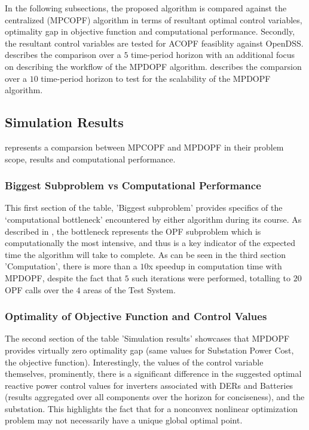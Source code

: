 \documentclass[../../outputs/main.tex]{subfiles}
\begin{document}
In the following subsections, the proposed algorithm is compared against the centralized (MPCOPF) algorithm in terms of resultant optimal control variables, optimality gap in objective function and computational performance. Secondly, the resultant control variables are tested for ACOPF feasiblity against OpenDSS.  describes the comparison over a $5$ time-period horizon with an additional focus on describing the workflow of the MPDOPF algorithm.  describes the comparsion over a $10$ time-period horizon to test for the scalability of the MPDOPF algorithm.

\subsection{Simulation Results} \label{subsec:simulationResults}

 represents a comparsion between MPCOPF and MPDOPF in their problem scope, results and computational performance.

\subsubsection{Biggest Subproblem vs Computational Performance}
This first section of the table, 'Biggest subproblem' provides specifics of the `computational bottleneck' encountered by either algorithm during its course. As described in , the bottleneck represents the OPF subproblem which is computationally the most intensive, and thus is a key indicator of the expected time the algorithm will take to complete. As can be seen in the third section 'Computation', there is more than a $10$x speedup in computation time with MPDOPF, despite the fact that $5$ such iterations were performed, totalling to $20$ OPF calls over the $4$ areas of the Test System.      

\subsubsection{Optimality of Objective Function and Control Values}
The second section of the table 'Simulation results' showcases that MPDOPF provides virtually zero optimality gap (same values for Substation Power Cost, the objective function). Interestingly, the values of the control variable themselves, prominently, there is a significant difference in the suggested optimal reactive power control values for inverters associated with DERs and Batteries (results aggregated over all components over the horizon for conciseness), and the substation. This highlights the fact that for a nonconvex nonlinear optimization problem may not necessarily have a unique global optimal point. 
\end{document}
